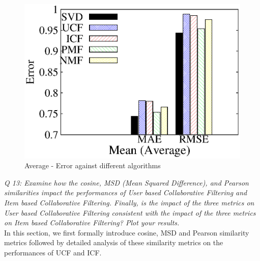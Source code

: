 \documentclass[journal,onecolumn]{IEEEtran}
\begin{document}
\begin{figure}[H]
\begin{center}
 \includegraphics[scale = 0.98] {images/mean.eps}
 \caption {Average - Error against different algorithms} \label{mean}
 \end{center}
\end{figure}

\textit{Q 13: Examine how the cosine, MSD (Mean Squared Difference), and Pearson similarities impact the
performances of User based Collaborative Filtering and Item based Collaborative Filtering. Finally, is the impact of the three metrics on User based Collaborative Filtering consistent with the impact of the three metrics on Item based Collaborative Filtering? Plot your results.} \\

In this section, we first formally introduce cosine, MSD and Pearson similarity metrics followed by detailed analysis of these similarity metrics on the performances of UCF and ICF.
\end{document}
